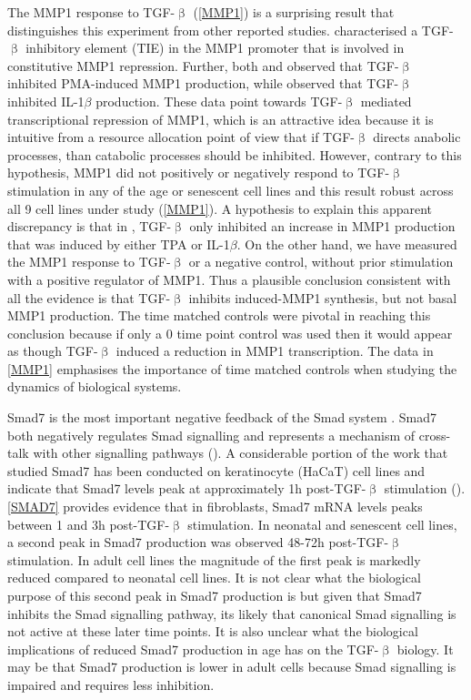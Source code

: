 \documentclass[alpha-refs]{wiley-article}
\newcommand{\tgf}{TGF-$\upbeta$}
\begin{document}
The MMP1 response to \tgf{} (\cref{MMP1}) is a surprising result that distinguishes this experiment from other reported studies. \cite{White2000} characterised a \tgf{} inhibitory element (TIE) in the MMP1 promoter that is involved in constitutive MMP1 repression. Further, both \cite{White2000} and \cite{Edwards1996} observed that \tgf{} inhibited PMA-induced MMP1 production, while \citep{Yuan2001} observed that \tgf{} inhibited IL-1$\beta$ production. These data point towards \tgf{} mediated transcriptional repression of MMP1, which is an attractive idea because it is intuitive from a resource allocation point of view that if \tgf{} directs anabolic processes, than catabolic processes should be inhibited. However, contrary to this hypothesis, MMP1 did not positively or negatively respond to \tgf{} stimulation in any of the age or senescent cell lines and this result robust across all 9 cell lines under study (\cref{MMP1}). A hypothesis to explain this apparent discrepancy is that in \citep{White2000, Edwards1996, Yuan2001}, \tgf{} only inhibited an increase in MMP1 production that was induced by either TPA or IL-1$\beta$. On the other hand, we have measured the MMP1 response to \tgf{} or a negative control, without prior stimulation with a positive regulator of MMP1. Thus a plausible conclusion consistent with all the evidence is that \tgf{} inhibits induced-MMP1 synthesis, but not basal MMP1 production. The time matched controls were pivotal in reaching this conclusion because if only a 0 time point control was used then it would appear as though \tgf{} induced a reduction in MMP1 transcription. The data in \cref{MMP1} emphasises the importance of time matched controls when studying the dynamics of biological systems.

Smad7 is the most important negative feedback of the Smad system \citep{Hayashi1997, Nakao1997, Yan2016, Gersdorff2000, Ebisawa2001, Hanyu2001, Pulaski2001, Suzuki2002, Shi2004, Zhang2007}. Smad7 both negatively regulates Smad signalling and represents a mechanism of cross-talk with other signalling pathways (\cite{Yan2011}). A considerable portion of the work that studied Smad7 has been conducted on keratinocyte (HaCaT) cell lines and indicate that Smad7 levels peak at approximately 1h post-\tgf{} stimulation (\cite{Denissova2000}). \cref{SMAD7} provides evidence that in fibroblasts, Smad7 mRNA levels peaks between 1 and 3h post-\tgf{} stimulation. In neonatal and senescent cell lines, a second peak in Smad7 production was observed 48-72h post-\tgf{} stimulation. In adult cell lines the magnitude of the first peak is markedly reduced compared to neonatal cell lines. It is not clear what the biological purpose of this second peak in Smad7 production is but given that Smad7 inhibits the Smad signalling pathway, its likely that canonical Smad signalling is not active at these later time points. It is also unclear what the biological implications of reduced Smad7 production in age has on the \tgf{} biology. It may be that Smad7 production is lower in adult cells because Smad signalling is impaired and requires less inhibition. 
\end{document}
